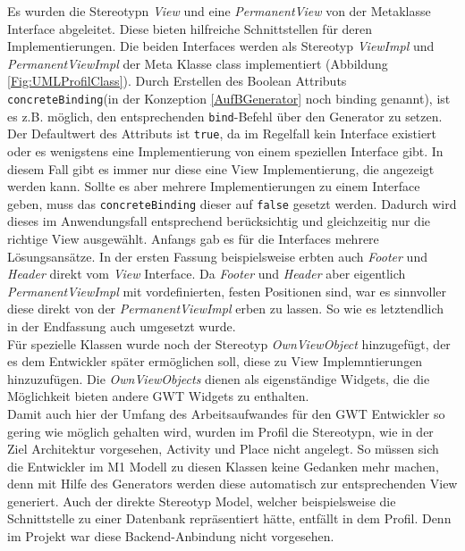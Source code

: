 Es wurden die Stereotypn \textit{View} und eine \textit{PermanentView} von der Metaklasse Interface abgeleitet. Diese bieten hilfreiche Schnittstellen für deren Implementierungen. Die beiden Interfaces werden als Stereotyp \textit{ViewImpl} und \textit{PermanentViewImpl} der Meta Klasse class implementiert (Abbildung \ref{Fig:UMLProfilClass}). Durch Erstellen des Boolean Attributs \texttt{concreteBinding}(in der Konzeption \ref{AufBGenerator} noch binding genannt),  ist es z.B. möglich, den entsprechenden \texttt{bind}-Befehl über den Generator zu setzen. Der Defaultwert des Attributs ist \texttt{true}, da im Regelfall kein Interface existiert oder es wenigstens eine Implementierung von einem speziellen Interface gibt. In diesem Fall gibt es immer nur diese eine View Implementierung, die angezeigt werden kann. Sollte es aber mehrere Implementierungen zu einem Interface geben, muss das \texttt{concreteBinding} dieser auf \texttt{false} gesetzt werden. Dadurch wird dieses im Anwendungsfall entsprechend berücksichtig und gleichzeitig nur die richtige View ausgewählt.
Anfangs gab es für die Interfaces mehrere Lösungsansätze. In der ersten Fassung beispielsweise erbten auch \textit{Footer} und \textit{Header} direkt vom \textit{View} Interface. Da \textit{Footer} und \textit{Header} aber eigentlich \textit{PermanentViewImpl} mit vordefinierten, festen Positionen sind, war es sinnvoller diese direkt von der \textit{PermanentViewImpl} erben zu lassen. So wie es letztendlich in der Endfassung auch umgesetzt wurde.\\

Für spezielle Klassen wurde noch der Stereotyp \textit{OwnViewObject} hinzugefügt, der es dem Entwickler später ermöglichen soll, diese zu View Implemntierungen hinzuzufügen. Die \textit{OwnViewObjects} dienen als eigenständige Widgets, die die Möglichkeit bieten andere GWT Widgets zu enthalten. \\

Damit auch hier der Umfang des Arbeitsaufwandes für den GWT Entwickler so gering wie möglich gehalten wird, wurden im Profil die Stereotypn, wie in der Ziel Architektur vorgesehen, Activity und Place nicht angelegt. So müssen sich die Entwickler im M1 Modell zu diesen Klassen keine Gedanken mehr machen, denn mit Hilfe des Generators werden diese automatisch zur entsprechenden View generiert. Auch der direkte Stereotyp Model, welcher beispielsweise die Schnittstelle zu einer Datenbank repräsentiert hätte, entfällt in dem Profil. Denn im Projekt war diese Backend-Anbindung nicht vorgesehen.